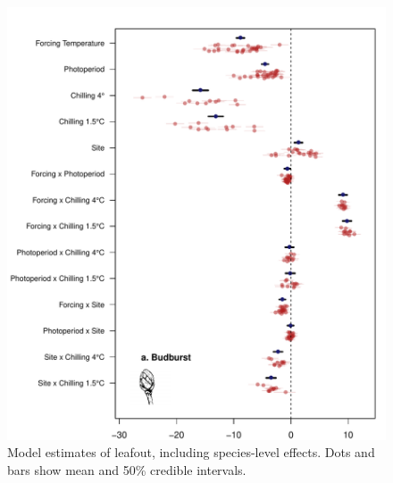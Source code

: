 \documentclass{article}
\begin{document}
\begin{figure}
\label{figS3}
\includegraphics[width=1\textwidth, page=2]{Fig1_bb_lo+sp}
\caption{Model estimates of leafout, including species-level effects. Dots and bars show mean and 50\% credible intervals.}
\end{figure}
\end{document}
